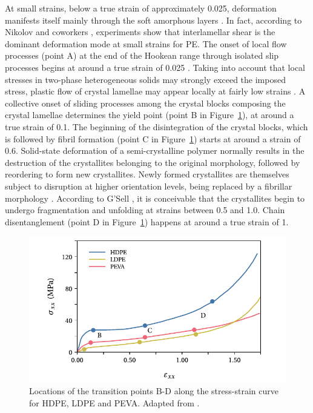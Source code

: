 At small strains, below a true strain of approximately \num{0.025}, deformation manifests itself mainly through the soft amorphous layers \citep{patlazhanStructuralMechanicsSemicrystalline2012}.
In fact, according to Nikolov and coworkers  \citep{nikolovMicroMacroConstitutive2000, nikolovMultiscaleConstitutiveModeling2002}, experiments show that interlamellar shear is the dominant deformation mode at small strains for PE.
The onset of local flow processes (point A) at the end of the Hookean range through isolated slip processes begins at around a true strain of \num{0.025} \citep{hissNetworkStretchingSlip1999}.
Taking into account that local stresses in two-phase heterogeneous solids may strongly exceed the imposed stress, plastic flow of crystal lamellae may appear locally at fairly low strains \citep{patlazhanStructuralMechanicsSemicrystalline2012}.
A collective onset of sliding processes among the crystal blocks composing the crystal lamellae determines the yield point (point B in Figure~\ref{fig:stress_strain_curve_strobl}), at around a true strain of 0.1.
The beginning of the disintegration of the crystal blocks, which is followed by fibril formation (point C in Figure~\ref{fig:stress_strain_curve_strobl}) starts at around a strain of 0.6.
Solid-state deformation of a semi-crystalline polymer normally results in the destruction of the crystallites belonging to the original morphology, followed by reordering to form new crystallites.
Newly formed crystallites are themselves subject to disruption at higher orientation levels, being replaced by a fibrillar morphology  \citep{peacockHandbookPolyethyleneStructures2014}.
According to G'Sell \citep{gsellEvolutionMicrostructureSemicrystalline1994}, it is conceivable that the crystallites begin to undergo fragmentation and unfolding at strains between 0.5 and 1.0.
Chain disentanglement (point D in Figure~\ref{fig:stress_strain_curve_strobl}) happens at around a true strain of 1.
\begin{figure}[htbp]
	\centering
	\includegraphics[width=\textwidth]{figures/stress_strain_curve_strobl}
	\caption{Locations of the transition points B-D along the stress-strain curve for HDPE, LDPE and PEVA. Adapted from \cite{hissNetworkStretchingSlip1999}.}
\label{fig:stress_strain_curve_strobl}
\end{figure}

